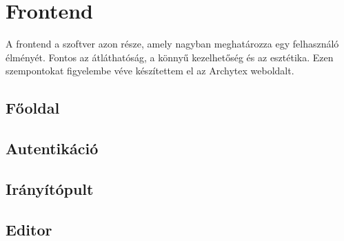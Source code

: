 \section{Frontend}
A frontend a szoftver azon része, amely nagyban meghatározza egy felhasználó élményét. Fontos az átláthatóság, a könnyű kezelhetőség és az esztétika. Ezen szempontokat figyelembe véve készítettem el az Archytex weboldalt.

\subsection{Főoldal}
\subsection{Autentikáció}
\subsection{Irányítópult}
\subsection{Editor}